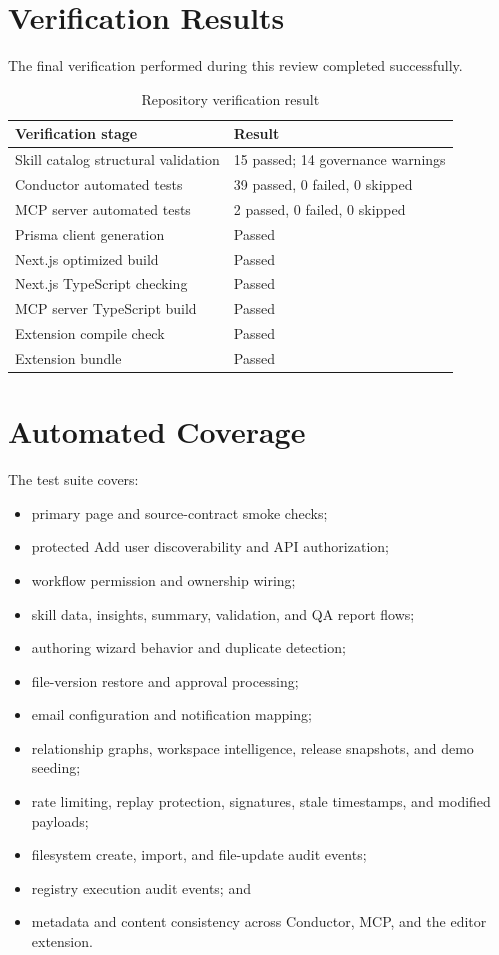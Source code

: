 \documentclass[12pt]{report}
\begin{document}
\section{Verification Results}

The final verification performed during this review completed successfully.

\begin{table}[hbt!]
\centering
\begin{tabular}{ll}
\toprule
Verification stage & Result \\
\midrule
Skill catalog structural validation & 15 passed; 14 governance warnings \\
Conductor automated tests & 39 passed, 0 failed, 0 skipped \\
MCP server automated tests & 2 passed, 0 failed, 0 skipped \\
Prisma client generation & Passed \\
Next.js optimized build & Passed \\
Next.js TypeScript checking & Passed \\
MCP server TypeScript build & Passed \\
Extension compile check & Passed \\
Extension bundle & Passed \\
\bottomrule
\end{tabular}
\caption{Repository verification result}
\label{tab:verification}
\end{table}

\section{Automated Coverage}

The test suite covers:

\begin{itemize}
  \item primary page and source-contract smoke checks;
  \item protected Add user discoverability and API authorization;
  \item workflow permission and ownership wiring;
  \item skill data, insights, summary, validation, and QA report flows;
  \item authoring wizard behavior and duplicate detection;
  \item file-version restore and approval processing;
  \item email configuration and notification mapping;
  \item relationship graphs, workspace intelligence, release snapshots, and demo seeding;
  \item rate limiting, replay protection, signatures, stale timestamps, and modified payloads;
  \item filesystem create, import, and file-update audit events;
  \item registry execution audit events; and
  \item metadata and content consistency across Conductor, MCP, and the editor extension.
\end{itemize}
\end{document}
